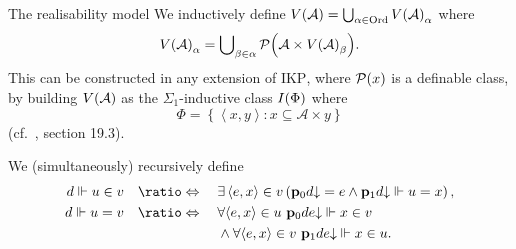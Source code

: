 \documentclass{beamer}
\newcommand\tuple[1]{\left\langle #1 \right\rangle}
\begin{document}
\begin{frame}{The realisability model}
  We inductively define $V\mleft(\mathcal{A}\mright) = \bigcup_{\alpha \in \mathrm{Ord}} V\mleft(\mathcal{A}\mright)_\alpha$ where
  \[V\mleft(\mathcal{A}\mright)_\alpha = \bigcup\nolimits_{\beta \in \alpha} \mathcal{P}\mleft(\mathcal{A} \times V\mleft(\mathcal{A}\mright)_\beta\mright).\]
  This can be constructed in any extension of $\mathrm{IKP}$, where $\mathcal{P}\mleft(x\mright)$ is a definable class, by building $V\mleft(\mathcal{A}\mright)$ as the $\Sigma_1$-inductive class $I\mleft(\Phi\mright)$ where
  \[\Phi = \left\{\tuple{x, y} : x \subseteq \mathcal{A} \times y\right\}\]
  (cf.\ , section 19.3).

  \vspace{0.6em}

  We (simultaneously) recursively define
  \begin{align*}
    d \Vdash u \in v \quad & \ratio\Leftrightarrow \quad \exists \tuple{e, x} \in v \left(\mathbf{p}_0 d {\downarrow} = e \land \mathbf{p}_1 d {\downarrow} \Vdash u = x\right), \\
    d \Vdash u = v \quad   & \ratio\Leftrightarrow \quad \begin{aligned}[t]
                                                            & \forall {\tuple{e, x} \in u} \ \mathbf{p}_0 de {\downarrow} \Vdash x \in v           \\
                                                            & {} \land \forall {\tuple{e, x} \in v} \ \mathbf{p}_1 de {\downarrow} \Vdash x \in u.
                                                         \end{aligned}
  \end{align*}
\end{frame}
\end{document}
